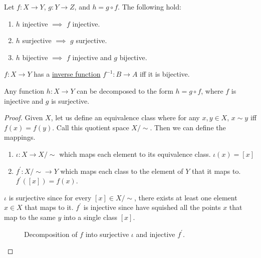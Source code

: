   \begin{theorem}
    \label{thm:injectivity-surjectivity}
    Let $f: X \rightarrow Y$, $g: Y \rightarrow Z$, and $h = g \circ f$. The following hold: 
    \begin{enumerate}
      \item $h$ injective $\implies$ $f$ injective. 
      \item $h$ surjective $\implies$ $g$ surjective. 
      \item $h$ bijective $\implies$ $f$ injective and $g$ bijective. 
    \end{enumerate}
  \end{theorem} 

  \begin{corollary}
    \label{thm:bijection-equals-existence-of-inverse}
    $f: X \rightarrow Y$ has a \hyperref[def:inverse-function]{inverse function} $f^{-1}: B \rightarrow A$ iff it is bijective. 
  \end{corollary}

  \begin{corollary}[Decomposition]
    \label{thm:decomposition}
    Any function $h: X \rightarrow Y$ can be decomposed to the form $h = g \circ f$, where $f$ is injective and $g$ is surjective. 
  \end{corollary}
  \begin{proof}
    Given $X$, let us define an equivalence class where for any $x, y \in X$, $x \sim y$ iff $f(x) = f(y)$. Call this quotient space $X / \sim$. Then we can define the mappings. 
    \begin{enumerate}
      \item $\iota: X \rightarrow X / \sim$ which maps each element to its equivalence class. $\iota(x) = [x]$
      \item $f^\prime: X / \sim \rightarrow Y$ which maps each class to the element of $Y$ that it maps to. $f^\prime ([x]) = f(x)$. 
    \end{enumerate}
    $\iota$ is surjective since for every $[x] \in X / \sim$, there exists at least one element $x \in X$ that maps to it. $f^\prime$ is injective since have squished all the points $x$ that map to the same $y$ into a single class $[x]$. 

    \begin{figure}[H]
      \centering 
      \caption{Decomposition of $f$ into surjective $\iota$ and injective $f^\prime$. } 
      \label{fig:decomposition}
    \end{figure}
  \end{proof}

